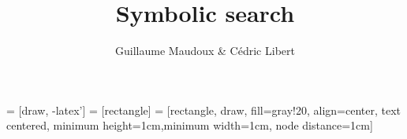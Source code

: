 \documentclass[10pt,a4paper,pdf]{beamer}
\author{Guillaume Maudoux \& Cédric Libert}
\title{Symbolic search}
\begin{document}
 = [draw, -latex']
 = [rectangle]
 = [rectangle, draw, fill=gray!20, align=center,
     text centered, minimum height=1cm,minimum width=1cm, node distance=1cm]	
\maketitle
%
%
\end{document}
